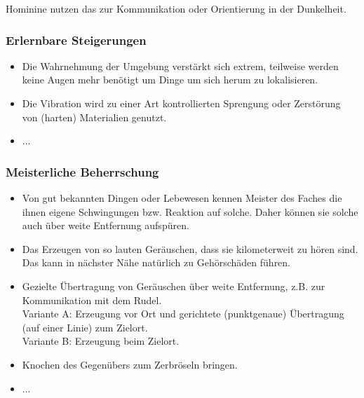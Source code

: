 Hominine nutzen das zur Kommunikation oder Orientierung in der Dunkelheit. 

\subsubsection{Erlernbare Steigerungen}
\begin{itemize}
	\item Die Wahrnehmung der Umgebung verstärkt sich extrem, teilweise werden keine Augen mehr benötigt um Dinge um sich herum zu lokalisieren. 
	\item Die Vibration wird zu einer Art kontrollierten Sprengung oder Zerstörung von (harten) Materialien genutzt.
	\item ...
\end{itemize}

\subsubsection{Meisterliche Beherrschung} 
\begin{itemize}
	\item Von gut bekannten Dingen oder Lebewesen kennen Meister des Faches die ihnen eigene Schwingungen bzw. Reaktion auf solche. Daher können sie solche auch über weite Entfernung aufspüren.
	\item Das Erzeugen von so lauten Geräuschen, dass sie kilometerweit zu hören sind. Das kann in nächster Nähe natürlich zu Gehörschäden führen.
	\item Gezielte Übertragung von Geräuschen über weite Entfernung, z.B. zur Kommunikation mit dem Rudel. \\ 
	Variante A: Erzeugung vor Ort und gerichtete (punktgenaue) Übertragung (auf einer Linie) zum Zielort. \\
	Variante B: Erzeugung beim Zielort.
	\item Knochen des Gegenübers zum Zerbröseln bringen.
	\item ...
\end{itemize}
